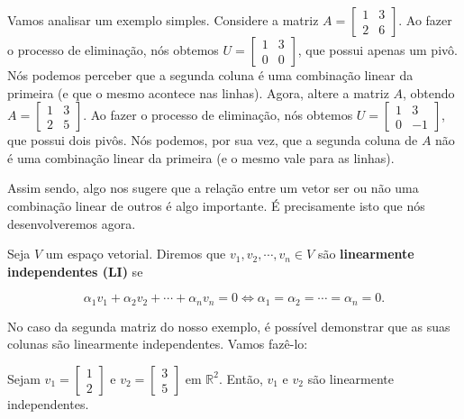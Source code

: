 Vamos analisar um exemplo simples. Considere a matriz $A = \begin{bmatrix}
	1 & 3 \\
	2 & 6
\end{bmatrix}$. Ao fazer o processo de eliminação, nós obtemos $U = \begin{bmatrix}
	1 & 3 \\
	0 & 0
\end{bmatrix}$, que possui apenas um pivô. Nós podemos perceber que a segunda coluna é uma combinação linear da primeira (e que o mesmo acontece nas linhas). Agora, altere a matriz $A$, obtendo $A = \begin{bmatrix}
	1 & 3 \\
	2 & 5
\end{bmatrix}$. Ao fazer o processo de eliminação, nós obtemos $U = \begin{bmatrix}
	1 & 3 \\
	0 & -1
\end{bmatrix}$, que possui dois pivôs. Nós podemos, por sua vez, que a segunda coluna de $A$ não é uma combinação linear da primeira (e o mesmo vale para as linhas).

Assim sendo, algo nos sugere que a relação entre um vetor ser ou não uma combinação linear de outros é algo importante. É precisamente isto que nós desenvolveremos agora.

\begin{Definition}
	Seja $V$ um espaço vetorial. Diremos que $v_1, v_2, \cdots, v_n\in V$ são \textbf{linearmente independentes (LI)} se
	
	$$
	\alpha_1v_1 + \alpha_2v_2 + \cdots + \alpha_nv_n = 0 \iff \alpha_1 = \alpha_2 = \cdots = \alpha_n = 0.
	$$
\end{Definition}

No caso da segunda matriz do nosso exemplo, é possível demonstrar que as suas colunas são linearmente independentes. Vamos fazê-lo:

\begin{Proposition}
	Sejam $v_1 = \begin{bmatrix}
		1 \\
		2
	\end{bmatrix}$ e $v_2 = \begin{bmatrix}
		3 \\
		5
	\end{bmatrix}$ em $\mathbb{R}^2$. Então, $v_1$ e $v_2$ são linearmente independentes.
\end{Proposition}


